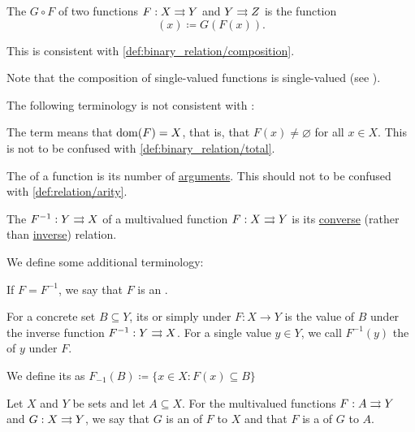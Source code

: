 \begin{definition}
\begin{defenum}[resume=def:function]
     The  \( G \circ F \) of two functions \( F: X \rightrightarrows Y \) and \( Y \rightrightarrows Z \) is the function
    \begin{equation*}
      [G \circ F](x) \coloneqq G(F(x)).
    \end{equation*}

    This is consistent with \cref{def:binary_relation/composition}.

    Note that the composition of single-valued functions is single-valued (see ).
  \end{defenum}

  The following terminology is not consistent with :
  \begin{defenum}[resume=def:function]
     The term  means that \( \operatorname{dom}(F) = X \), that is, that \( F(x) \neq \varnothing \) for all \( x \in X \). This is not to be confused with \cref{def:binary_relation/total}.

     The  of a function is its number of \hyperref[def:function/arity]{arguments}. This should not to be confused with \cref{def:relation/arity}.

     The  \( F^{-1}: Y \rightrightarrows X \) of a multivalued function \( F: X \rightrightarrows Y \) is its \hyperref[def:binary_relation/converse]{converse} (rather than \hyperref[def:binary_relation/inverse]{inverse}) relation.
  \end{defenum}

  We define some additional terminology:
  \begin{defenum}[resume=def:function]
     If \( F = F^{-1} \), we say that \( F \) is an .

     For a concrete set \( B \subseteq Y \), its  or simply  under \( F: X \to Y \) is the value of \( B \) under the inverse function \( F^{-1}: Y \rightrightarrows X \). For a single value \( y \in Y \), we call \( F^{-1}(y) \) the  of \( y \) under \( F \).

    We define its  as \( F_{-1}(B) \coloneqq \{ x \in X \colon F(x) \subseteq B \} \)

     Let \( X \) and \( Y \) be sets and let \( A \subseteq X \). For the multivalued functions \( F: A \rightrightarrows Y \) and \( G: X \rightrightarrows Y \), we say that \( G \) is an  of \( F \) to \( X \) and that \( F \) is a  of \( G \) to \( A \).


\end{defenum}
\end{definition}
